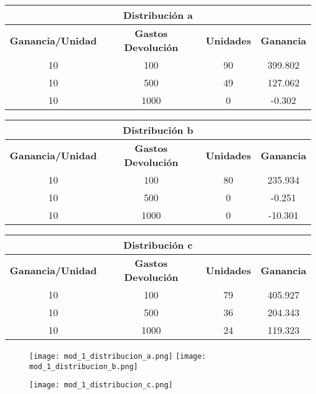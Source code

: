 \begin{table}[h!]
\centering
\begin{tabular}{|c|c|c|c|}
\hline
\multicolumn{4}{|c|}{\textbf{Distribución a}} \\ \hline
\textbf{Ganancia/Unidad} & \textbf{Gastos Devolución} & \textbf{Unidades} & \textbf{Ganancia} \\ \hline
10 & 100 & 90 & 399.802 \\
10 & 500 & 49 & 127.062 \\
10 & 1000 & 0 & -0.302 \\ \hline
\end{tabular}
\end{table}

\begin{table}[h!]
\centering
\begin{tabular}{|c|c|c|c|}
\hline
\multicolumn{4}{|c|}{\textbf{Distribución b}} \\ \hline
\textbf{Ganancia/Unidad} & \textbf{Gastos Devolución} & \textbf{Unidades} & \textbf{Ganancia} \\ \hline
10 & 100 & 80 & 235.934 \\
10 & 500 & 0 & -0.251 \\
10 & 1000 & 0 & -10.301 \\ \hline
\end{tabular}
\end{table}

\begin{table}[h!]
\centering
\begin{tabular}{|c|c|c|c|}
\hline
\multicolumn{4}{|c|}{\textbf{Distribución c}} \\ \hline
\textbf{Ganancia/Unidad} & \textbf{Gastos Devolución} & \textbf{Unidades} & \textbf{Ganancia} \\ \hline
10 & 100 & 79 & 405.927 \\
10 & 500 & 36 & 204.343 \\
10 & 1000 & 24 & 119.323 \\ \hline
\end{tabular}
\end{table}

\newpage

\begin{figure}[h!]
	\texttt{[image: mod\_1\_distribucion\_a.png]}
	\texttt{[image: mod\_1\_distribucion\_b.png]}
\end{figure}
\begin{figure}[h!]
	\texttt{[image: mod\_1\_distribucion\_c.png]}
\end{figure}

